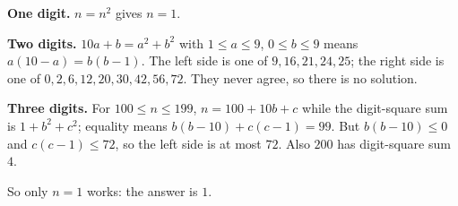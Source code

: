 \textbf{One digit.} $n=n^2$ gives $n=1$.

\textbf{Two digits.} $10a+b=a^2+b^2$ with $1\le a\le9$, $0\le b\le9$ means $a(10-a)=b(b-1)$. The left side is one of $9,16,21,24,25$; the right side is one of $0,2,6,12,20,30,42,56,72$. They never agree, so there is no solution.

\textbf{Three digits.} For $100\le n\le199$, $n=100+10b+c$ while the digit-square sum is $1+b^2+c^2$; equality means $b(b-10)+c(c-1)=99$. But $b(b-10)\le0$ and $c(c-1)\le72$, so the left side is at most $72$. Also $200$ has digit-square sum $4$.

So only $n=1$ works: the answer is $\boxed{1}$.

